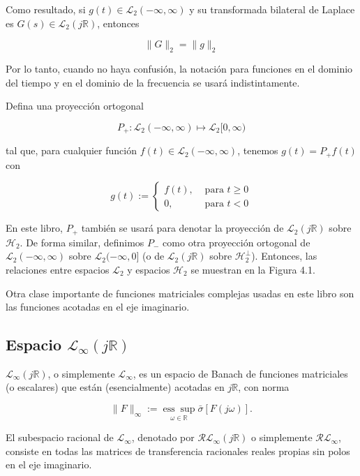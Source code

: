 Como resultado, si $g(t) \in \mathcal{L}_{2}(-\infty, \infty)$ y su transformada bilateral de Laplace es $G(s) \in \mathcal{L}_{2}(j \mathbb{R})$, entonces

$$
\|G\|_{2}=\|g\|_{2}
$$

Por lo tanto, cuando no haya confusión, la notación para funciones en el dominio del tiempo y en el dominio de la frecuencia se usará indistintamente.


Defina una proyección ortogonal

$$
P_{+}: \mathcal{L}_{2}(-\infty, \infty) \longmapsto \mathcal{L}_{2}[0, \infty)
$$

tal que, para cualquier función $f(t) \in \mathcal{L}_{2}(-\infty, \infty)$, tenemos $g(t)=P_{+} f(t)$ con

$$
g(t):=\left\{\begin{array}{cl}
f(t), & \text { para } t \geq 0 \\
0, & \text { para } t<0
\end{array}\right.
$$

En este libro, $P_{+}$ también se usará para denotar la proyección de $\mathcal{L}_{2}(j \mathbb{R})$ sobre $\mathcal{H}_{2}$. De forma similar, definimos $P_{-}$ como otra proyección ortogonal de $\mathcal{L}_{2}(-\infty, \infty)$ sobre $\mathcal{L}_{2}(-\infty, 0]$ (o de $\mathcal{L}_{2}(j \mathbb{R})$ sobre $\mathcal{H}_{2}^{\perp}$). Entonces, las relaciones entre espacios $\mathcal{L}_{2}$ y espacios $\mathcal{H}_{2}$ se muestran en la Figura 4.1.

Otra clase importante de funciones matriciales complejas usadas en este libro son las funciones acotadas en el eje imaginario.

\subsection*{Espacio $\mathcal{L}_{\infty}(j \mathbb{R})$}
$\mathcal{L}_{\infty}(j \mathbb{R})$, o simplemente $\mathcal{L}_{\infty}$, es un espacio de Banach de funciones matriciales (o escalares) que están (esencialmente) acotadas en $j \mathbb{R}$, con norma

$$
\|F\|_{\infty}:=\underset{\omega \in \mathbb{R}}{\operatorname{ess} \sup } \bar{\sigma}[F(j \omega)] .
$$

El subespacio racional de $\mathcal{L}_{\infty}$, denotado por $\mathcal{R} \mathcal{L}_{\infty}(j \mathbb{R})$ o simplemente $\mathcal{R} \mathcal{L}_{\infty}$, consiste en todas las matrices de transferencia racionales reales propias sin polos en el eje imaginario.

